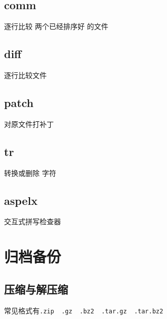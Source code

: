 \documentclass[UTF8,a4paper,12pt]{ctexbook}
\begin{document}
		\subsection{comm} 逐行比较 两个已经排序好 的文件
		
		\subsection{diff} 逐行比较文件
		
		\subsection{patch} 对原文件打补丁
		
		\subsection{tr} 转换或删除 字符
		
		\subsection{aspelx} 交互式拼写检查器
		
		
	\section{归档备份}
		\subsection{压缩与解压缩}常见格式有\verb|.zip  .gz  .bz2  .tar.gz  .tar.bz2|
			
\end{document}

